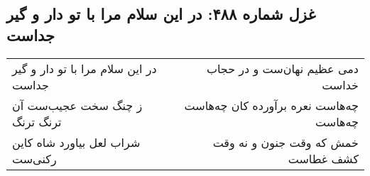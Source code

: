 \begin{center}
\section*{غزل شماره ۴۸۸: در این سلام مرا با تو دار و گیر جداست}
\label{sec:0488}
\begin{longtable}{l p{0.5cm} r}
در این سلام مرا با تو دار و گیر جداست
&&
دمی عظیم نهان‌ست و در حجاب خداست
\\
ز چنگ سخت عجیب‌ست آن ترنگ ترنگ
&&
چه‌هاست نعره برآورده کان چه‌هاست چه‌هاست
\\
شراب لعل بیاورد شاه کاین رکنی‌ست
&&
خمش که وقت جنون و نه وقت کشف غطاست
\\
\end{longtable}
\end{center}
